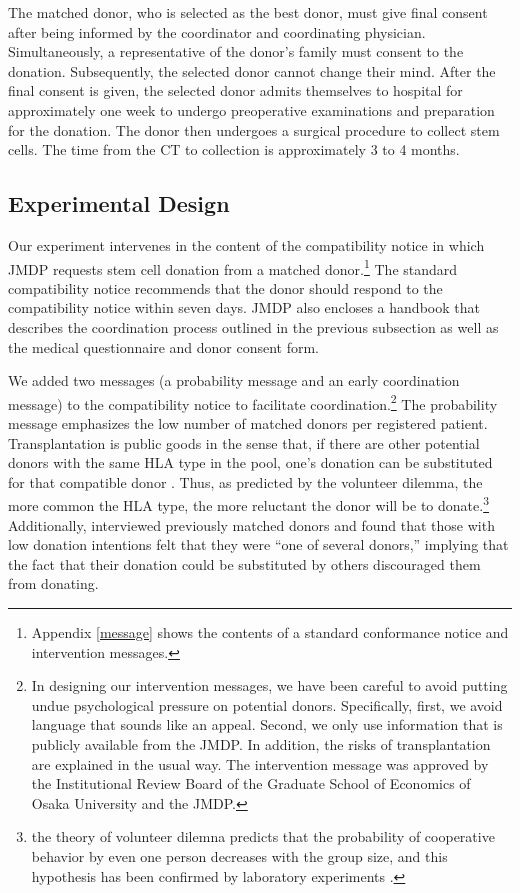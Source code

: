 \documentclass[12pt, a4paper]{article}
\begin{document}
The matched donor, who is selected as the best donor, must give final consent after being informed by the coordinator and coordinating physician. Simultaneously, a representative of the donor's family must consent to the donation. Subsequently, the selected donor cannot change their mind. After the final consent is given, the selected donor admits themselves to hospital for approximately one week to undergo preoperative examinations and preparation for the donation. The donor then undergoes a surgical procedure to collect stem cells. The time from the CT to collection is approximately 3 to 4 months.

\hypertarget{design}{%
\subsection{Experimental Design}\label{design}}

Our experiment intervenes in the content of the compatibility notice in which JMDP requests stem cell donation from a matched donor.\footnote{Appendix \ref{message} shows the contents of a standard conformance notice and intervention messages.} The standard compatibility notice recommends that the donor should respond to the compatibility notice within seven days. JMDP also encloses a handbook that describes the coordination process outlined in the previous subsection as well as the medical questionnaire and donor consent form.

We added two messages (a probability message and an early coordination message) to the compatibility notice to facilitate coordination.\footnote{In designing our intervention messages, we have been careful to avoid putting undue psychological pressure on potential donors. Specifically, first, we avoid language that sounds like an appeal. Second, we only use information that is publicly available from the JMDP. In addition, the risks of transplantation are explained in the usual way. The intervention message was approved by the Institutional Review Board of the Graduate School of Economics of Osaka University and the JMDP.} The probability message emphasizes the low number of matched donors per registered patient. Transplantation is public goods in the sense that, if there are other potential donors with the same HLA type in the pool, one's donation can be substituted for that compatible donor \citep{Bergstrom2009}. Thus, as predicted by the volunteer dilemma, the more common the HLA type, the more reluctant the donor will be to donate.\footnote{the theory of volunteer dilemna predicts that the probability of cooperative behavior by even one person decreases with the group size, and this hypothesis has been confirmed by laboratory experiments \citep{Diekmann1985, Diekmann1986, Franzen1999, Davis2017}.} Additionally, \citet{Kurosawa2022} interviewed previously matched donors and found that those with low donation intentions felt that they were ``one of several donors,'' implying that the fact that their donation could be substituted by others discouraged them from donating.
\end{document}
